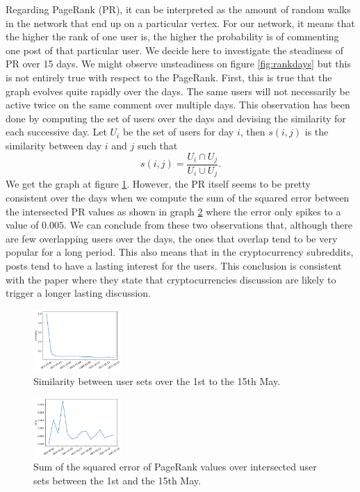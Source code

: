 Regarding PageRank (PR), it can be interpreted as the amount of random walks in the network that end up on a particular vertex. For our network, it means that the higher the rank of one user is, the higher the probability is of commenting one post of that particular user. We decide here to investigate the steadiness of PR over 15 days. We might observe unsteadiness on figure \ref{fig:rankdays} but this is not entirely true with respect to the PageRank. First, this is true that the graph evolves quite rapidly over the days. The same users will not necessarily be active twice on the same comment over multiple days. This observation has been done by computing the set of users over the days and devising the similarity for each successive day. Let $U_i$ be the set of users for day $i$, then $s\left(i,j\right)$ is the similarity between day $i$ and $j$ such that $$s\left(i,j\right)=\frac{U_i\cap U_{j}}{U_i\cup U_{j}}.$$ We get the graph at figure \ref{fig:simdays}. However, the PR itself seems to be pretty consistent over the days when we compute the sum of the squared error between the intersected PR values as shown in graph \ref{fig:errordays} where the error only spikes to a value of $0.005$. We can conclude from these two observations that, although there are few overlapping users over the days, the ones that overlap tend to be very popular for a long period. This also means that in the cryptocurrency subreddits, posts tend to have a lasting interest for the users. This conclusion is consistent with the paper  where they state that cryptocurrencies discussion are likely to trigger a longer lasting discussion.
\begin{figure}[ht!]
    \centering
    \includegraphics[width=0.3\textwidth]{figures/sim_days.pdf}
    \caption{Similarity between user sets over the 1st to the 15th May.}
    \label{fig:simdays}
\end{figure}
\begin{figure}[ht!]
    \centering
    \includegraphics[width=0.3\textwidth]{figures/error_days.pdf}
    \caption{Sum of the squared error of PageRank values over intersected user sets between the 1st and the 15th May.}
    \label{fig:errordays}
\end{figure}


